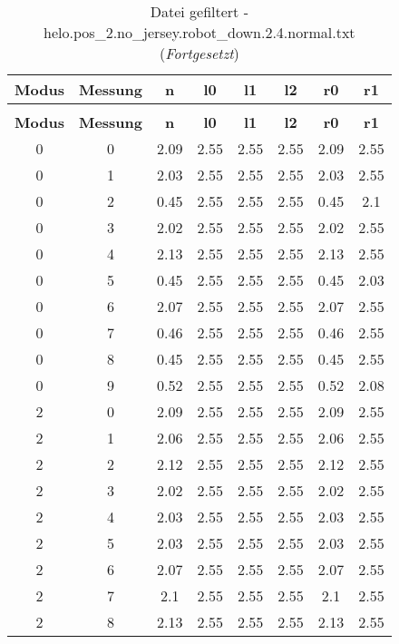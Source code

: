 \begin{longtable}{|c|c||c||c|c|c||c|c|}
	\caption{Datei gefiltert - helo.pos\_2.no\_jersey.robot\_down.2.4.normal.txt} \label{tab:helo.pos-2.no-jersey.robot-down.2.4.normal.txt} \\ \hline
	\textbf{Modus} & \textbf{Messung} & \textbf{n} & \textbf{l0} & \textbf{l1} & \textbf{l2} & \textbf{r0} & \textbf{r1}\\ \hline
	\endfirsthead
	\caption[]{Datei gefiltert - helo.pos\_2.no\_jersey.robot\_down.2.4.normal.txt (\emph{Fortgesetzt})} \\ \hline
	\textbf{Modus} & \textbf{Messung} & \textbf{n} & \textbf{l0} & \textbf{l1} & \textbf{l2} & \textbf{r0} & \textbf{r1}\\ \hline
	\endhead
	0 & 0 & 2.09 & 2.55 & 2.55 & 2.55 & 2.09 & 2.55 \\ \hline
	0 & 1 & 2.03 & 2.55 & 2.55 & 2.55 & 2.03 & 2.55 \\ \hline
	0 & 2 & 0.45 & 2.55 & 2.55 & 2.55 & 0.45 & 2.1 \\ \hline
	0 & 3 & 2.02 & 2.55 & 2.55 & 2.55 & 2.02 & 2.55 \\ \hline
	0 & 4 & 2.13 & 2.55 & 2.55 & 2.55 & 2.13 & 2.55 \\ \hline
	0 & 5 & 0.45 & 2.55 & 2.55 & 2.55 & 0.45 & 2.03 \\ \hline
	0 & 6 & 2.07 & 2.55 & 2.55 & 2.55 & 2.07 & 2.55 \\ \hline
	0 & 7 & 0.46 & 2.55 & 2.55 & 2.55 & 0.46 & 2.55 \\ \hline
	0 & 8 & 0.45 & 2.55 & 2.55 & 2.55 & 0.45 & 2.55 \\ \hline
	0 & 9 & 0.52 & 2.55 & 2.55 & 2.55 & 0.52 & 2.08 \\ \hline
	2 & 0 & 2.09 & 2.55 & 2.55 & 2.55 & 2.09 & 2.55 \\ \hline
	2 & 1 & 2.06 & 2.55 & 2.55 & 2.55 & 2.06 & 2.55 \\ \hline
	2 & 2 & 2.12 & 2.55 & 2.55 & 2.55 & 2.12 & 2.55 \\ \hline
	2 & 3 & 2.02 & 2.55 & 2.55 & 2.55 & 2.02 & 2.55 \\ \hline
	2 & 4 & 2.03 & 2.55 & 2.55 & 2.55 & 2.03 & 2.55 \\ \hline
	2 & 5 & 2.03 & 2.55 & 2.55 & 2.55 & 2.03 & 2.55 \\ \hline
	2 & 6 & 2.07 & 2.55 & 2.55 & 2.55 & 2.07 & 2.55 \\ \hline
	2 & 7 & 2.1 & 2.55 & 2.55 & 2.55 & 2.1 & 2.55 \\ \hline
	2 & 8 & 2.13 & 2.55 & 2.55 & 2.55 & 2.13 & 2.55 \\ \hline

\end{longtable}
